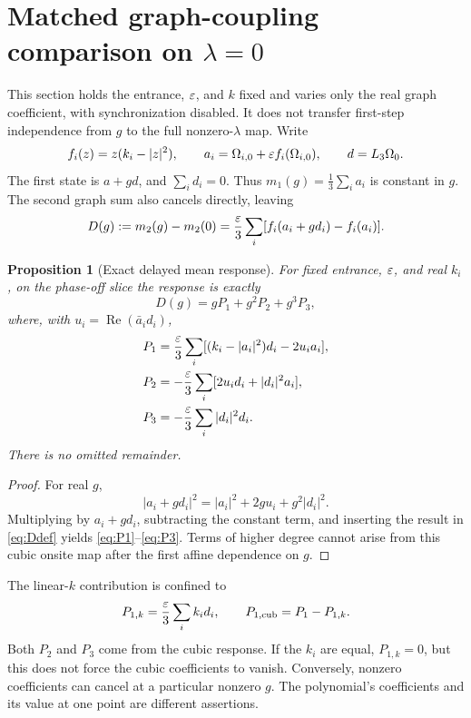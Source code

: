 \documentclass[11pt,a4paper]{article}
\numberwithin{equation}{section}
\newtheorem{proposition}[theorem]{Proposition}
\theoremstyle{remark}\newtheorem{remark}[theorem]{Remark}
\newcommand{\re}{\operatorname{Re}}\newcommand{\im}{\operatorname{Im}}
\begin{document}
\section{Matched graph-coupling comparison on \texorpdfstring{$\lambda=0$}{lambda=0}}\label{sec:delayed}

This section holds the entrance, $\varepsilon$, and $k$ fixed and varies only the real graph coefficient, with synchronization disabled. It does not transfer first-step independence from $g$ to the full nonzero-$\lambda$ map. Write
\begin{equation}
f_i(z)=z(k_i-|z|^2),\qquad
a_i=\Omega_{i,0}+\varepsilon f_i(\Omega_{i,0}),\qquad d=L_3\Omega_0.
\end{equation}
The first state is $a+gd$, and $\sum_i d_i=0$. Thus $m_1(g)=\frac13\sum_i a_i$ is constant in $g$. The second graph sum also cancels directly, leaving
\begin{equation}
D(g):=m_2(g)-m_2(0)
=\frac{\varepsilon}3\sum_i[f_i(a_i+gd_i)-f_i(a_i)].\label{eq:Ddef}
\end{equation}

\begin{proposition}[Exact delayed mean response]\label{prop:poly}
For fixed entrance, $\varepsilon$, and real $k_i$, on the phase-off slice the response is exactly
\begin{equation}
D(g)=gP_1+g^2P_2+g^3P_3,\label{eq:poly}
\end{equation}
where, with $u_i=\re(\bar a_i d_i)$,
\begin{align}
P_1&=\frac{\varepsilon}3\sum_i[(k_i-|a_i|^2)d_i-2u_i a_i],\label{eq:P1}\\
P_2&=-\frac{\varepsilon}3\sum_i[2u_i d_i+|d_i|^2a_i],\label{eq:P2}\\
P_3&=-\frac{\varepsilon}3\sum_i|d_i|^2d_i.\label{eq:P3}
\end{align}
There is no omitted remainder.
\end{proposition}
\begin{proof}
For real $g$,
\[
|a_i+gd_i|^2=|a_i|^2+2gu_i+g^2|d_i|^2.
\]
Multiplying by $a_i+gd_i$, subtracting the constant term, and inserting the result in \eqref{eq:Ddef} yields \eqref{eq:P1}--\eqref{eq:P3}. Terms of higher degree cannot arise from this cubic onsite map after the first affine dependence on $g$.
\end{proof}

The linear-$k$ contribution is confined to
\begin{equation}
P_{1,k}=\frac{\varepsilon}3\sum_i k_i d_i,
\qquad P_{1,\rm cub}=P_1-P_{1,k}.
\end{equation}
Both $P_2$ and $P_3$ come from the cubic response. If the $k_i$ are equal, $P_{1,k}=0$, but this does not force the cubic coefficients to vanish. Conversely, nonzero coefficients can cancel at a particular nonzero $g$. The polynomial's coefficients and its value at one point are different assertions.
\end{document}
